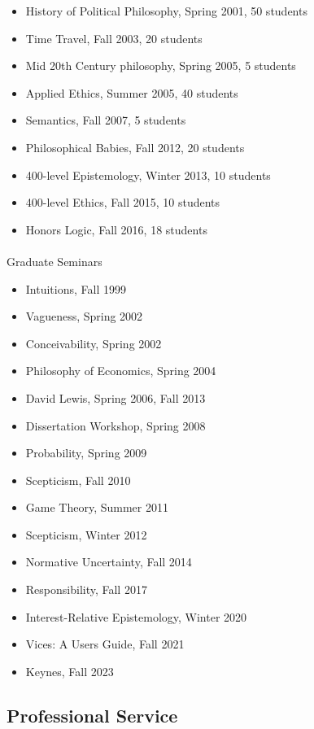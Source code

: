 \documentclass[
  10pt,
  letterpaper,
  DIV=11,
  numbers=noendperiod,
  twoside]{scrartcl}
\makeatletter
\let\oldparagraph\paragraph
\renewcommand{\paragraph}{
    \@ifstar
      \xxxParagraphStar
      \xxxParagraphNoStar
  }
\newcommand{\xxxParagraphStar}[1]{\oldparagraph*{#1}\mbox{}}
\newcommand{\xxxParagraphNoStar}[1]{\oldparagraph{#1}\mbox{}}
\providecommand{\tightlist}{%
  \setlength{\itemsep}{0pt}\setlength{\parskip}{0pt}}
\makeatother
\begin{document}
\begin{itemize}
\tightlist
\item
  History of Political Philosophy, Spring 2001, 50 students
\item
  Time Travel, Fall 2003, 20 students
\item
  Mid 20th Century philosophy, Spring 2005, 5 students
\item
  Applied Ethics, Summer 2005, 40 students
\item
  Semantics, Fall 2007, 5 students
\item
  Philosophical Babies, Fall 2012, 20 students
\item
  400-level Epistemology, Winter 2013, 10 students
\item
  400-level Ethics, Fall 2015, 10 students
\item
  Honors Logic, Fall 2016, 18 students
\end{itemize}

\paragraph{Graduate Seminars}\label{graduate-seminars}

\begin{itemize}
\tightlist
\item
  Intuitions, Fall 1999
\item
  Vagueness, Spring 2002
\item
  Conceivability, Spring 2002
\item
  Philosophy of Economics, Spring 2004
\item
  David Lewis, Spring 2006, Fall 2013
\item
  Dissertation Workshop, Spring 2008
\item
  Probability, Spring 2009
\item
  Scepticism, Fall 2010
\item
  Game Theory, Summer 2011
\item
  Scepticism, Winter 2012
\item
  Normative Uncertainty, Fall 2014
\item
  Responsibility, Fall 2017
\item
  Interest-Relative Epistemology, Winter 2020
\item
  Vices: A Users Guide, Fall 2021
\item
  Keynes, Fall 2023
\end{itemize}

\subsection{Professional Service}\label{professional-service}
\end{document}
